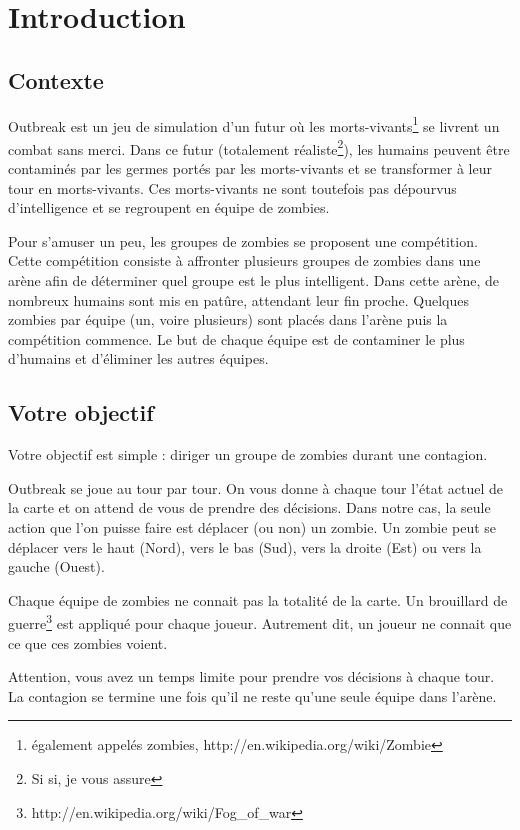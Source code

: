 \section{Introduction} %
\label{sec:Introduction}

\subsection{Contexte} %
\label{sub:Contexte}

Outbreak est un jeu de simulation d'un futur où les morts-vivants\footnote{également appelés zombies, http://en.wikipedia.org/wiki/Zombie} se livrent un combat sans merci.
Dans ce futur (totalement réaliste\footnote{Si si, je vous assure}), les humains peuvent être contaminés par les germes portés par les morts-vivants et se transformer à leur tour en morts-vivants.
Ces morts-vivants ne sont toutefois pas dépourvus d'intelligence et se regroupent en équipe de zombies.

Pour s'amuser un peu, les groupes de zombies se proposent une compétition.
Cette compétition consiste à affronter plusieurs groupes de zombies dans une arène afin de déterminer quel groupe est le plus intelligent.
Dans cette arène, de nombreux humains sont mis en patûre, attendant leur fin proche.
Quelques zombies par équipe (un, voire plusieurs) sont placés dans l'arène puis la compétition commence.
Le but de chaque équipe est de contaminer le plus d'humains et d'éliminer les autres équipes.



\subsection{Votre objectif} %
\label{sub:Votre objectif}

Votre objectif est simple : diriger un groupe de zombies durant une contagion.

Outbreak se joue au tour par tour.
On vous donne à chaque tour l'état actuel de la carte et on attend de vous de prendre des décisions.
Dans notre cas, la seule action que l'on puisse faire est déplacer (ou non) un zombie.
Un zombie peut se déplacer vers le haut (Nord), vers le bas (Sud), vers la droite (Est) ou vers la gauche (Ouest).

Chaque équipe de zombies ne connait pas la totalité de la carte.
Un brouillard de guerre\footnote{http://en.wikipedia.org/wiki/Fog\_of\_war} est appliqué pour chaque joueur.
Autrement dit, un joueur ne connait que ce que ces zombies voient.

Attention, vous avez un temps limite pour prendre vos décisions à chaque tour.
La contagion se termine une fois qu'il ne reste qu'une seule équipe dans l'arène.



